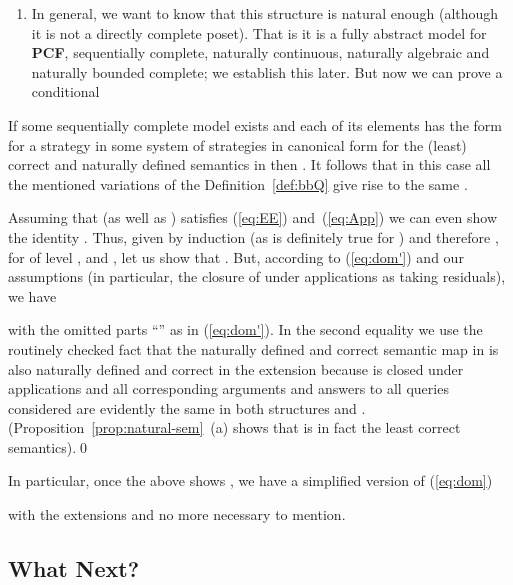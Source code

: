 \documentclass[fleqn]{LMCS}
\theoremstyle{plain}\newtheorem{satz}[thm]{Satz}
\theoremstyle{plain}\newtheorem{hyp}[thm]{Hypothesis}
\theoremstyle{plain}\newtheorem{hyps}[thm]{Hypotheses}
\theoremstyle{definition}\newtheorem{note}[thm]{Note}
\newcommand{\PCF}{\mbox{\bf PCF}}
\newcommand{\?}{\mbox{?}}
\begin{document}
\begin{enumerate}[(1)]
\item
In general, we want to know that this structure is natural enough 
(although it is not a directly complete poset). 
That is it is a fully abstract model for \PCF, sequentially complete, 
naturally continuous, naturally algebraic and 
naturally bounded complete; we establish this later.  
But now we can prove a conditional 

\end{enumerate}














\begin{prop}\label{prop:conditional-isomorphism}
If some 
sequentially complete model  exists 
and each of its elements has the form 
 for a strategy in some system of strategies 
in canonical form for  the (least) correct and naturally defined 
semantics in  then . 
It follows that in this case all the mentioned variations of the Definition~\ref{def:bbQ} 
give rise to the same . 
\end{prop}
\proof 
Assuming 
that  (as well as ) satisfies 
(\ref{eq:EE}) and~(\ref{eq:App}) we can even show the identity . 
Thus, given by induction  
(as is definitely true for ) 
and therefore 
, 
for  of level , 
and , 
let us show that . 
But, according to (\ref{eq:dom'}) and our assumptions (in particular, the closure of 
 under applications as taking residuals), we have 
 
with the omitted parts ``'' as in (\ref{eq:dom'}).
In the second equality we use 
the routinely checked fact that the naturally defined and correct semantic map 
 in  is also naturally defined and correct in the extension 
 because  is closed 
under applications and all corresponding arguments and answers to all 
queries considered are evidently the same in both structures 
 and . 
(Proposition~\ref{prop:natural-sem}~(a) shows that  is in fact the least 
correct semantics).\qed


\noindent
In particular, once the above shows , 
we have a simplified version of (\ref{eq:dom})

with the extensions 
 and  no more necessary to mention. 








\subsection{What Next?}
\label{sec:what-next}
\end{document}
